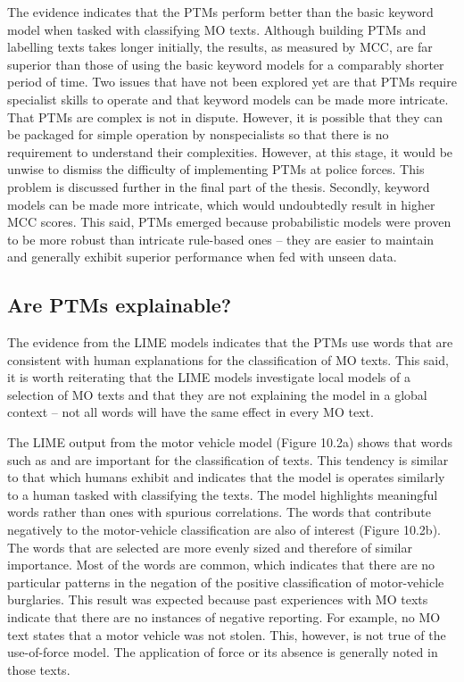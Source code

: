 The evidence indicates that the PTMs perform better than the basic keyword model when tasked with classifying MO texts. Although building PTMs and labelling texts takes longer initially, the results, as measured by MCC, are far superior than those of using the basic keyword models for a comparably shorter period of time. Two issues that have not been explored yet are that PTMs require specialist skills to operate and that keyword models can be made more intricate. That PTMs are complex is not in dispute. However, it is possible that they can be packaged for simple operation by nonspecialists so that there is no requirement to understand their complexities. However, at this stage, it would be unwise to dismiss the difficulty of implementing PTMs at police forces. This problem is discussed further in the final part of the thesis. Secondly, keyword models can be made more intricate, which would undoubtedly result in higher MCC scores. This said, PTMs emerged because probabilistic models were proven to be more robust than intricate rule-based ones – they are easier to maintain and generally exhibit superior performance when fed with unseen data.

\subsection{Are PTMs explainable?} The evidence from the LIME models indicates that the PTMs use words that are consistent with human explanations for the classification of MO texts. This said, it is worth reiterating that the LIME models investigate local models of a selection of MO texts and that they are not explaining the model in a global context – not all words will have the same effect in every MO text. 

The LIME output from the motor vehicle model (Figure 10.2a) shows that words such as  and  are important for the classification of texts. This tendency is similar to that which humans exhibit and indicates that the model is operates similarly to a human tasked with classifying the texts. The model highlights meaningful words rather than ones with spurious correlations. The words that contribute negatively to the motor-vehicle classification are also of interest (Figure 10.2b). The words that are selected are more evenly sized and therefore of similar importance. Most of the words are common, which indicates that there are no particular patterns in the negation of the positive classification of motor-vehicle burglaries. This result was expected because past experiences with MO texts indicate that there are no instances of negative reporting. For example, no MO text states that a motor vehicle was not stolen. This, however, is not true of the use-of-force model. The application of force or its absence is generally noted in those texts.

